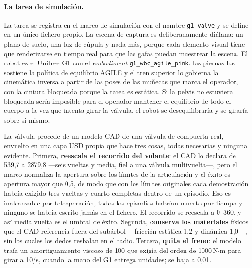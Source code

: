 \paragraph{La tarea de simulación.} La tarea se registra en el marco de simulación con el nombre
\texttt{g1\_valve} y se define en un único fichero propio. La escena de captura es deliberadamente
diáfana: un plano de suelo, una luz de cúpula y nada más, porque cada elemento visual tiene que
renderizarse en tiempo real para que las gafas puedan muestrear la escena. El robot es el Unitree
G1 con el \textit{embodiment}
\texttt{g1\_wbc\_agile\_pink}: las piernas las sostiene la política de equilibrio AGILE y el tren
superior lo gobierna la cinemática inversa a partir de las poses de las muñecas que marca el
operador, con la cintura bloqueada porque la tarea es estática. Si la pelvis no estuviera bloqueada
sería imposible para el operador mantener el equilibrio de todo el cuerpo a la vez que intenta
girar la válvula, el robot se desequilibraría y se giraría sobre si mismo.

La válvula procede de un modelo CAD de una válvula de compuerta real, envuelto en una capa USD
propia que hace tres cosas, todas necesarias y ninguna evidente. Primera, \textbf{reescala el
recorrido del volante}: el CAD lo declara de 539,7\textdegree{} a 2879,8\textdegree{} —seis vueltas
y media, fiel a una válvula multivuelta—, pero el marco normaliza la apertura sobre los límites de la
articulación y el éxito es apertura mayor que 0,5, de modo que con los límites originales cada
demostración habría exigido tres vueltas y cuarto completas dentro de un episodio. Eso es
inalcanzable por teleoperación, todos los episodios habrían muerto por tiempo y ninguno se habría
escrito jamás en el fichero. El recorrido se reescala a 0--360\textdegree, y así media vuelta es el
umbral de éxito. Segunda, \textbf{conserva los materiales} físicos que el CAD referencia fuera del
subárbol —fricción estática 1,2 y dinámica 1,0—, sin los cuales los dedos resbalan en el radio.
Tercera, \textbf{quita el freno}: el modelo traía un amortiguamiento viscoso de 100 que exigía del
orden de 1000\,N$\cdot$m para girar a 10\textdegree/s, cuando la mano del G1 entrega unidades; se
baja a 0,01.

